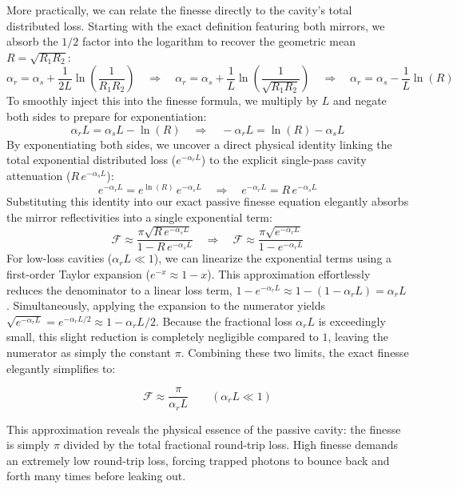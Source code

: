 More practically, we can relate the finesse directly to the cavity's total distributed loss. Starting with the exact definition featuring both mirrors, we absorb the $1/2$ factor into the logarithm to recover the geometric mean $R = \sqrt{R_1 R_2}$:
\begin{equation*}
    \alpha_r = \alpha_s + \frac{1}{2L}\ln\left(\frac{1}{R_1 R_2}\right) \quad \Rightarrow \quad \alpha_r = \alpha_s + \frac{1}{L}\ln\left(\frac{1}{\sqrt{R_1 R_2}}\right) \quad \Rightarrow \quad \alpha_r = \alpha_s - \frac{1}{L}\ln(R)
\end{equation*}
To smoothly inject this into the finesse formula, we multiply by $L$ and negate both sides to prepare for exponentiation:
\begin{equation*}
    \alpha_r L = \alpha_s L - \ln(R) \quad \Rightarrow \quad -\alpha_r L = \ln(R) - \alpha_s L
\end{equation*}
By exponentiating both sides, we uncover a direct physical identity linking the total exponential distributed loss ($e^{-\alpha_r L}$) to the explicit single-pass cavity attenuation ($R\,e^{-\alpha_s L}$):
\begin{equation*}
    e^{-\alpha_r L} = e^{\ln(R)}\,e^{-\alpha_s L} \quad \Rightarrow \quad e^{-\alpha_r L} = R\,e^{-\alpha_s L}
\end{equation*}
Substituting this identity into our exact passive finesse equation elegantly absorbs the mirror reflectivities into a single exponential term:
\begin{equation*}
    \mathcal{F} \approx \frac{\pi\sqrt{R\,e^{-\alpha_s L}}}{1 - R\,e^{-\alpha_s L}} \quad \Rightarrow \quad \mathcal{F} \approx \frac{\pi\sqrt{e^{-\alpha_r L}}}{1 - e^{-\alpha_r L}}
\end{equation*}
For low-loss cavities ($\alpha_r L \ll 1$), we can linearize the exponential terms using a first-order Taylor expansion ($e^{-x} \approx 1 - x$). This approximation effortlessly reduces the denominator to a linear loss term, $1 - e^{-\alpha_r L} \approx 1 - (1 - \alpha_r L) = \alpha_r L$. Simultaneously, applying the expansion to the numerator yields $\sqrt{e^{-\alpha_r L}} = e^{-\alpha_r L / 2} \approx 1 - \alpha_r L / 2$. Because the fractional loss $\alpha_r L$ is exceedingly small, this slight reduction is completely negligible compared to $1$, leaving the numerator as simply the constant $\pi$. Combining these two limits, the exact finesse elegantly simplifies to:
\begin{keyresult}
    \begin{equation}
        \mathcal{F} \approx \frac{\pi}{\alpha_r L} \qquad (\alpha_r L \ll 1)
    \end{equation}
\end{keyresult}
This approximation reveals the physical essence of the passive cavity: the finesse is simply $\pi$ divided by the total fractional round-trip loss. High finesse demands an extremely low round-trip loss, forcing trapped photons to bounce back and forth many times before leaking out.

